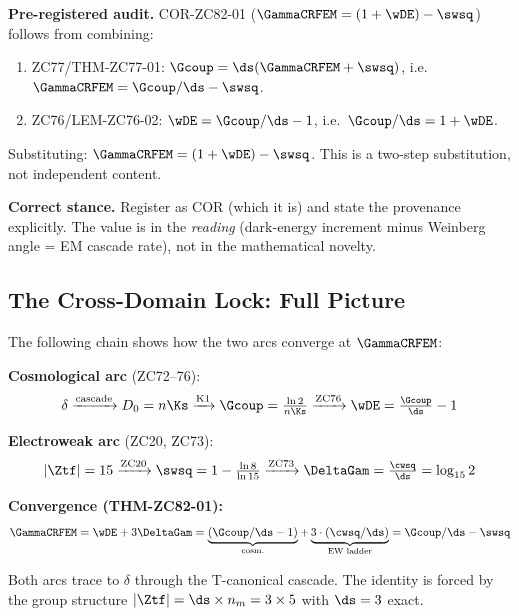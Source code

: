 \documentclass[12pt, a4paper]{article}
\begin{document}
\begin{openqbox}[title={PM-ZC82-TAUTOLOGY-01: COR-ZC82-01 Is
  a Rearrangement, Not a New Theorem (pre-registered)
  (pattern: tautology test)}]

\textbf{Pre-registered audit.}
COR-ZC82-01 ($\GammaCRFEM = (1+\wDE) - \swsq$) follows from
combining:
\begin{enumerate}[leftmargin=2em, noitemsep]
  \item ZC77/THM-ZC77-01: $\Gcoup = \ds(\GammaCRFEM + \swsq)$,
    i.e.\ $\GammaCRFEM = \Gcoup/\ds - \swsq$.
  \item ZC76/LEM-ZC76-02: $\wDE = \Gcoup/\ds - 1$,
    i.e.\ $\Gcoup/\ds = 1 + \wDE$.
\end{enumerate}
Substituting: $\GammaCRFEM = (1 + \wDE) - \swsq$. This
is a two-step substitution, not independent content.

\textbf{Correct stance.}
Register as COR (which it is) and state the provenance
explicitly. The value is in the \emph{reading} (dark-energy
increment minus Weinberg angle = EM cascade rate), not in
the mathematical novelty.
\end{openqbox}

\subsection{The Cross-Domain Lock: Full Picture}
\label{sec:lock}

\begin{keybox}[title={Cross-Domain Lock Diagram ---
  Cosmological $\times$ Electroweak $\to$ EM}]

The following chain shows how the two arcs converge at
$\GammaCRFEM$:

\medskip
\textbf{Cosmological arc} (ZC72--76):
\[
  \delta \xrightarrow{\text{cascade}} D_0 = n\Ks
  \xrightarrow{\text{K1}} \Gcoup = \tfrac{\ln2}{n\Ks}
  \xrightarrow{\text{ZC76}} \wDE = \tfrac{\Gcoup}{\ds}-1
\]

\textbf{Electroweak arc} (ZC20, ZC73):
\[
  |\Ztf|=15 \xrightarrow{\text{ZC20}} \swsq = 1-\tfrac{\ln8}{\ln15}
  \xrightarrow{\text{ZC73}} \DeltaGam = \tfrac{\cwsq}{\ds} = \log_{15}2
\]

\textbf{Convergence (THM-ZC82-01):}
\[
  \GammaCRFEM = \wDE + 3\DeltaGam
  = \underbrace{(\Gcoup/\ds - 1)}_{\text{cosm.}} +
    \underbrace{3\cdot(\cwsq/\ds)}_{\text{EW ladder}}
  = \Gcoup/\ds - \swsq
\]

Both arcs trace to $\delta$ through the T-canonical cascade.
The identity is forced by the group structure
$|\Ztf| = \ds\times n_m = 3\times5$ with $\ds = 3$ exact.
\end{keybox}
\end{document}
